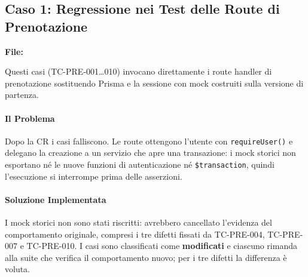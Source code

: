 \documentclass[11pt,a4paper,oneside,openany]{book}
\begin{document}
\subsection{Caso 1: Regressione nei Test delle Route di Prenotazione}

\textbf{File:} 

Questi casi (TC-PRE-001\dots010) invocano direttamente i route handler di
prenotazione sostituendo Prisma e la sessione con mock costruiti sulla
versione di partenza.

\paragraph{Il Problema}
Dopo la CR i casi falliscono. Le route ottengono l'utente con
\texttt{requireUser()} e delegano la creazione a un servizio che apre una
transazione: i mock storici non esportano né le nuove funzioni di
autenticazione né \texttt{\$transaction}, quindi l'esecuzione si interrompe
prima delle asserzioni.

\paragraph{Soluzione Implementata}
I mock storici non sono stati riscritti: avrebbero cancellato l'evidenza del
comportamento originale, compresi i tre difetti fissati da TC-PRE-004,
TC-PRE-007 e TC-PRE-010. I casi sono classificati come \textbf{modificati} e
ciascuno rimanda alla suite che verifica il comportamento nuovo; per i tre
difetti la differenza è voluta.
\end{document}
